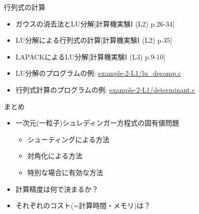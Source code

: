 \documentclass[dvipdfmx]{beamer}
\begin{document}
\begin{frame}[t,fragile]{行列式の計算}
  \begin{itemize}
    \setlength{\itemsep}{1em}
  \item ガウスの消去法とLU分解[計算機実験I (L2) p.26-34]
  \item LU分解による行列式の計算[計算機実験I (L2) p.35]
  \item LAPACKによるLU分解[計算機実験I (L3) p.9-10]
  \item LU分解のプログラムの例: \href{https://github.com/todo-group/computer-experiments/blob/master/exercise/linear_system/lu_decomp.c}{example-2-L1/lu\_decomp.c}
  \item 行列式計算のプログラムの例: \href{https://github.com/todo-group/computer-experiments/blob/master/exercise/linear_system/determinant.c}{example-2-L1/determinant.c}
  \end{itemize}
\end{frame}

\begin{frame}[t,fragile]{まとめ}
  \begin{itemize}
    \setlength{\itemsep}{1em}
  \item 一次元(一粒子)シュレディンガー方程式の固有値問題
    \begin{itemize}
    \item シューティングによる方法
    \item 対角化による方法
    \item 特別な場合に有効な方法
    \end{itemize}
  \item 計算精度は何で決まるか？
  \item それぞれのコスト(=計算時間・メモリ)は？
  \end{itemize}
\end{frame}
\end{document}
